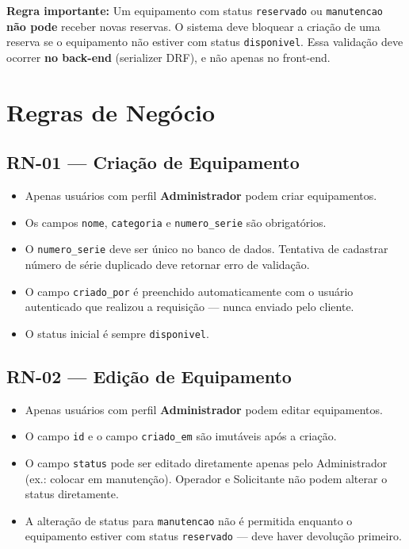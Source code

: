 \documentclass[12pt, a4paper]{article}
\begin{document}
\textbf{Regra importante:} Um equipamento com status \texttt{reservado} ou
\texttt{manutencao} \textbf{não pode} receber novas reservas. O sistema deve bloquear
a criação de uma reserva se o equipamento não estiver com status \texttt{disponivel}.
Essa validação deve ocorrer \textbf{no back-end} (serializer DRF), e não apenas no front-end.

\section{Regras de Negócio}

\subsection{RN-01 — Criação de Equipamento}
\begin{itemize}
  \item Apenas usuários com perfil \textbf{Administrador} podem criar equipamentos.
  \item Os campos \texttt{nome}, \texttt{categoria} e \texttt{numero\_serie} são obrigatórios.
  \item O \texttt{numero\_serie} deve ser único no banco de dados. Tentativa de cadastrar
        número de série duplicado deve retornar erro de validação.
  \item O campo \texttt{criado\_por} é preenchido automaticamente com o usuário autenticado
        que realizou a requisição — nunca enviado pelo cliente.
  \item O status inicial é sempre \texttt{disponivel}.
\end{itemize}

\subsection{RN-02 — Edição de Equipamento}
\begin{itemize}
  \item Apenas usuários com perfil \textbf{Administrador} podem editar equipamentos.
  \item O campo \texttt{id} e o campo \texttt{criado\_em} são imutáveis após a criação.
  \item O campo \texttt{status} pode ser editado diretamente apenas pelo Administrador
        (ex.: colocar em manutenção). Operador e Solicitante não podem alterar o status
        diretamente.
  \item A alteração de status para \texttt{manutencao} não é permitida enquanto o
        equipamento estiver com status \texttt{reservado} — deve haver devolução primeiro.
\end{itemize}
\end{document}
